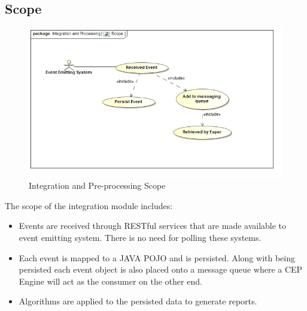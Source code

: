 \documentclass[11pt,a4paper]{article}
\begin{document}
\subsection{Scope}
\begin{figure}[H]
	\begin{center}
		\includegraphics[scale=0.6]{../Images/Integration_Scope.jpg}
		\caption{Integration and Pre-processing Scope}
	\end{center}
\end{figure}
The scope of the integration module includes:
\begin{itemize}
	\item Events are received through RESTful services that are made available to event emitting system. There is no need for polling these systems.
	\item Each event is mapped to a JAVA POJO and is persisted. Along with being persisted each event object is also placed onto a message queue where a CEP Engine will act as the consumer on the other end.
	\item Algorithms are applied to the persisted data to generate reports.
\end{itemize}
\end{document}
